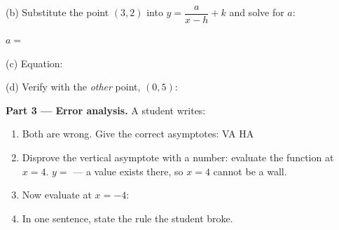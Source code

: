 \documentclass[10pt]{article}
\begin{document}
\begin{tcolorbox}[colback=white, colframe=black!40, title=\textbf{Tier A --- Approaching Proficiency},
    fonttitle=\bfseries, arc=1.5mm, left=3mm, right=3mm, top=2mm, bottom=2mm, breakable]
\begin{center}
\begin{minipage}{0.48\linewidth}
\vspace{4pt}
(b) Substitute the point $(3,2)$ into $y=\dfrac{a}{x-h}+k$ and solve for $a$:

\vspace{16pt}
$a=$ \blank{1.2cm}

\vspace{4pt}
(c) Equation: \blank{3.4cm}

\vspace{4pt}
(d) Verify with the \emph{other} point, $(0,5)$: \blank{2.4cm}
\end{minipage}
\end{center}

\vspace{4pt}
\textbf{Part 3 --- Error analysis.} A student writes:
\begin{center}
\end{center}
\begin{enumerate}[label=(\alph*), leftmargin=1.9em, itemsep=6pt]
  \item Both are wrong. Give the correct asymptotes: VA \blank{1.4cm} \quad HA \blank{1.4cm}
  \item Disprove the vertical asymptote with a number: evaluate the function at $x=4$.
        $y=$ \blank{1.6cm} \; --- a value exists there, so $x=4$ cannot be a wall.
  \item Now evaluate at $x=-4$: \blank{2.0cm}
  \item In one sentence, state the rule the student broke.
\end{enumerate}
\end{tcolorbox}
\end{document}
